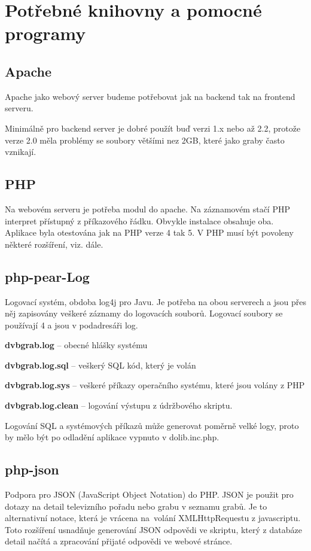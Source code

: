 \section{Potřebné knihovny a pomocné programy}
\subsection{Apache}
Apache jako webový server budeme potřebovat jak na backend tak na frontend serveru.

Minimálně pro backend server je dobré použít buď verzi 1.x nebo až 2.2, protože verze 2.0 měla problémy se soubory většími nez 2GB, které jako graby často vznikají.
\subsection{PHP}
Na webovém serveru je potřeba modul do apache. Na záznamovém stačí PHP interpret přístupný z příkazového řádku. Obvykle instalace obsahuje oba. Aplikace byla otestována jak na PHP verze 4 tak 5. V PHP musí být povoleny některé rozšíření, viz. dále.
\subsection{php-pear-Log}
Logovací systém, obdoba log4j pro Javu. Je potřeba na obou serverech a jsou přes něj zapisovány veškeré záznamy do logovacích souborů. Logovací soubory se používají 4 a jsou v podadresáři log.
\bitem
\item\textbf{dvbgrab.log} -- obecné hlášky systému
\item\textbf{dvbgrab.log.sql} -- veškerý SQL kód, který je volán
\item\textbf{dvbgrab.log.sys} -- veškeré příkazy operačního systému, které jsou volány z PHP
\item\textbf{dvbgrab.log.clean} -- logování výstupu z údržbového skriptu.
\eitem

Logování SQL a systémových příkazů může generovat poměrně velké logy, proto by mělo být po odladění aplikace vypnuto v dolib.inc.php.
\subsection{php-json}
Podpora pro JSON (JavaScript Object Notation) do PHP. JSON je použit pro dotazy na detail televizního pořadu nebo grabu v seznamu grabů. Je to alternativní notace, která je vrácena na~volání XMLHttpRequestu z javascriptu. Toto rozšíření usnadňuje generování JSON odpovědi ve skriptu, který z databáze detail načítá a zpracování přijaté odpovědi ve webové stránce.
